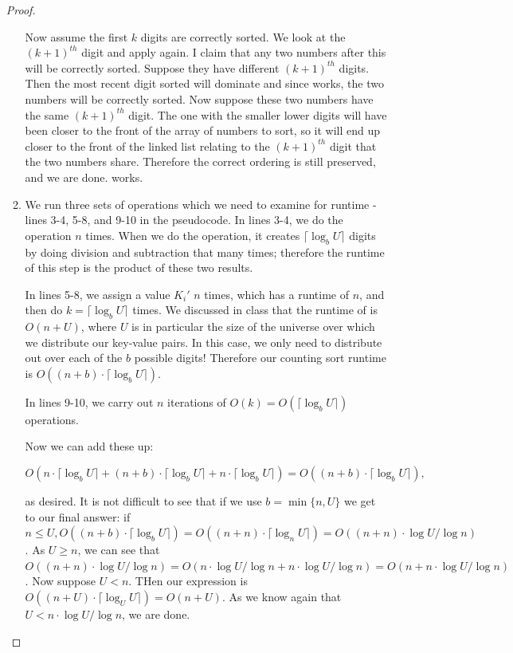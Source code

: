 \documentclass[11pt]{article}
\begin{document}
\begin{enumerate}
\begin{proof}
\begin{enumerate}[label = (\alph*)]
Now assume the first $k$ digits are correctly sorted. We look at the $(k + 1)^{th}$ digit and apply \CountingSort again. I claim that any two numbers after this will be correctly sorted. Suppose they have different $(k + 1)^{th}$ digits. Then the most recent digit sorted will dominate and since \CountingSort works, the two numbers will be correctly sorted. Now suppose these two numbers have the same $(k + 1)^{th}$ digit. The one with the smaller lower digits will have been closer to the front of the array of numbers to sort, so it will end up closer to the front of the linked list relating to the $(k + 1)^{th}$ digit that the two numbers share. Therefore the correct ordering is still preserved, and we are done. \RadixSort works.

\item We run three sets of operations which we need to examine for runtime - lines 3-4, 5-8, and 9-10 in the pseudocode. In lines 3-4, we do the \BC operation $n$ times. When we do the \BC operation, it creates $\lceil \log_b U \rceil$ digits by doing division and subtraction that many times; therefore the runtime of this step is the product of these two results.

In lines 5-8, we assign a value $K_i '$ $n$ times, which has a runtime of $n$, and then do \CountingSort $k = \lceil \log_b U \rceil$ times. We discussed in class that the runtime of \CountingSort is $O(n + U)$, where $U$ is in particular the size of the universe over which we distribute our key-value pairs. In this case, we only need to distribute out over each of the $b$ possible digits! Therefore our counting sort runtime is $O((n + b) \cdot \lceil \log_b U \rceil)$.

In lines 9-10, we carry out $n$ iterations of $O(k) = O(\lceil \log_b U \rceil)$ operations.

Now we can add these up:

$$
O(n \cdot \lceil \log_b U \rceil + (n + b) \cdot \lceil \log_b U \rceil + n \cdot \lceil \log_b U \rceil) = O((n + b) \cdot \lceil \log_b U \rceil),
$$

as desired. It is not difficult to see that if we use $b = \min \{ n, U \}$ we get to our final answer: if $n \leq U, O((n + b) \cdot \lceil \log_b U \rceil) = O((n + n) \cdot \lceil \log_n U \rceil) = O((n + n) \cdot \log U / \log n)$. As $U \geq n$, we can see that $O((n + n) \cdot \log U / \log n) = O(n \cdot \log U / \log n + n \cdot \log U / \log n) = O( n + n  \cdot \log U / \log n)$. Now suppose $U < n$. THen our expression is $O((n + U) \cdot \lceil \log_U U \rceil) = O(n + U)$. As we know again that $U < n \cdot  \log U / \log n$, we are done.


\end{enumerate}
\end{proof}
\end{enumerate}
\end{document}
